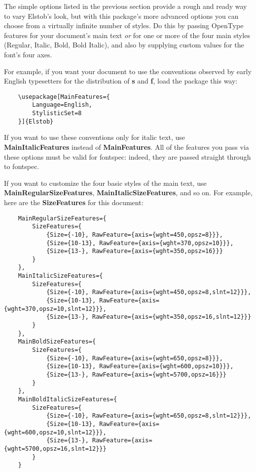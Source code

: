 \documentclass[12pt]{article}
\newcommand{\fspec}{{\sffamily fontspec}}
\begin{document}
The simple options listed in the previous section provide a rough and ready
way to vary Elstob's look, but with this package's more advanced options you can choose
from a virtually infinite number of styles. Do this by passing OpenType features 
for your document's main text \emph{or} for one or more of the four main styles
(Regular, Italic, Bold, Bold Italic), and also by supplying custom values for the
font's four axes.

For example, if you want your document to use the conventions observed by early
English typesetters for the distribution of \textbf{s} and \textbf{ſ}, load the
package this way:

\footnotesize
\begin{verbatim}
    \usepackage[MainFeatures={
        Language=English,
        StylisticSet=8
    }]{Elstob}
\end{verbatim}
\normalsize

\noindent If you want to use these conventions only for italic text, use
\textbf{MainItalicFeatures} instead of \textbf{MainFeatures}. All of the
features you pass via these options must be valid for \fspec: indeed,
they are passed straight through to \fspec.

If you want to customize the four basic styles of the main text, use
\textbf{MainRegularSizeFeatures}, \textbf{MainItalicSizeFeatures}, and so on.
For example, here are the \textbf{SizeFeatures} for this document:

\footnotesize
\begin{verbatim}
    MainRegularSizeFeatures={
        SizeFeatures={
            {Size={-10}, RawFeature={axis={wght=450,opsz=8}}},
            {Size={10-13}, RawFeature={axis={wght=370,opsz=10}}},
            {Size={13-}, RawFeature={axis={wght=350,opsz=16}}}
        }
    },
    MainItalicSizeFeatures={
        SizeFeatures={
            {Size={-10}, RawFeature={axis={wght=450,opsz=8,slnt=12}}},
            {Size={10-13}, RawFeature={axis={wght=370,opsz=10,slnt=12}}},
            {Size={13-}, RawFeature={axis={wght=350,opsz=16,slnt=12}}}
        }
    },
    MainBoldSizeFeatures={
        SizeFeatures={
            {Size={-10}, RawFeature={axis={wght=650,opsz=8}}},
            {Size={10-13}, RawFeature={axis={wght=600,opsz=10}}},
            {Size={13-}, RawFeature={axis={wght=5700,opsz=16}}}
        }
    },
    MainBoldItalicSizeFeatures={
        SizeFeatures={
            {Size={-10}, RawFeature={axis={wght=650,opsz=8,slnt=12}}},
            {Size={10-13}, RawFeature={axis={wght=600,opsz=10,slnt=12}}},
            {Size={13-}, RawFeature={axis={wght=5700,opsz=16,slnt=12}}}
        }
    }
\end{verbatim}\normalsize
\end{document}
